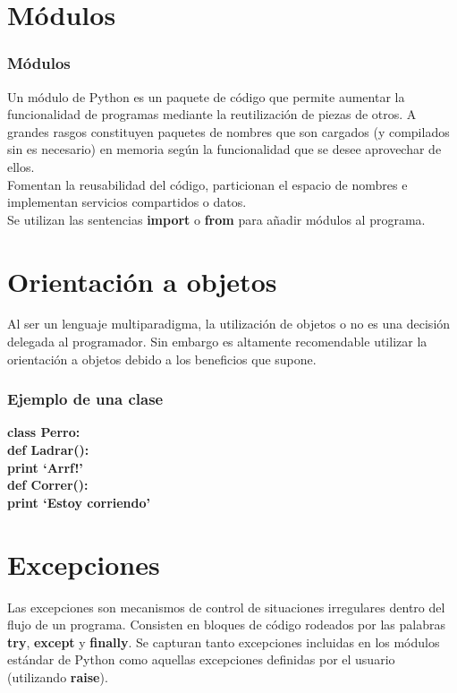\documentclass{beamer}
\begin{document}
\section{Módulos}
\begin{frame}
\frametitle{Módulos}
Un módulo de Python es un paquete de código que permite aumentar la funcionalidad de programas mediante la reutilización de piezas de otros. A grandes rasgos constituyen paquetes de nombres que son cargados (y compilados sin es necesario) en memoria según la funcionalidad que se desee aprovechar de ellos.\\
Fomentan la reusabilidad del código, particionan el espacio de nombres e implementan servicios compartidos o datos.\\
Se utilizan las sentencias \textbf{import} o \textbf{from} para añadir módulos al programa.
\end{frame}

\section{Orientación a objetos}
\begin{frame}
Al ser un lenguaje multiparadigma, la utilización de objetos o no es una decisión delegada al programador. Sin embargo es altamente recomendable utilizar la orientación a objetos debido a los beneficios que supone.
\end{frame}

\begin{frame}
\frametitle{Ejemplo de una clase}
\textbf{class Perro:\\
          def Ladrar():\\
		print `Arrf!'\\
	def Correr():\\
		print `Estoy corriendo'\\
	}	
\end{frame}

\section{Excepciones}
\begin{frame}
Las excepciones son mecanismos de control de situaciones irregulares dentro del flujo de un programa. Consisten en bloques de código rodeados por las palabras \textbf{try}, \textbf{except} y \textbf{finally}. Se capturan tanto excepciones incluidas en los módulos estándar de Python como aquellas excepciones definidas por el usuario (utilizando \textbf{raise}).
\end{frame}
\end{document}
